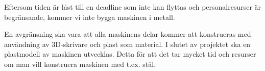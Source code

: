 Eftersom tiden är låst till en deadline som inte kan flyttas och personalresurser är begränsande, kommer vi inte bygga maskinen i metall.

En avgränsning ska vara att alla maskinens delar kommer att konstrueras med användning av 3D-skrivare och plast som material. I slutet av projektet ska en plastmodell av maskinen utvecklas. Detta för att det tar mycket tid och resurser om man vill konstruera maskinen med t.ex. stål.
